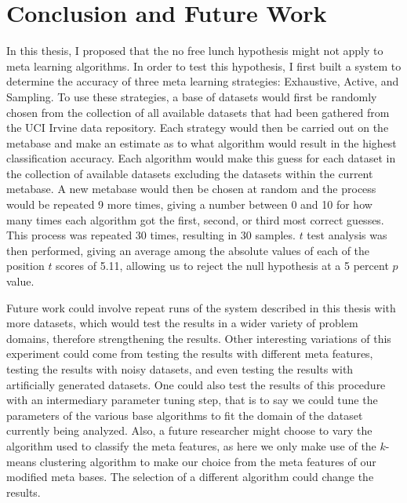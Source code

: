 \chapter{Conclusion and Future Work}
\label{Chapter5}
In this thesis, I proposed that the no free lunch hypothesis might not apply to
meta learning algorithms. In order to test this hypothesis, I first built a
system to determine the accuracy of three meta learning strategies:
Exhaustive, Active, and Sampling. To use these strategies, a base of
datasets would first be randomly chosen from the collection of all available
datasets that had been gathered from the UCI Irvine data repository.
Each strategy would then be carried out on the metabase and make an
estimate as to what algorithm would result in the highest classification
accuracy. Each algorithm would make this guess for each dataset in the
collection of available datasets excluding the datasets within the current
metabase. A new metabase would then be chosen at random and the process would be
repeated 9 more times, giving a number between 0 and 10 for how many times
each algorithm got the first, second, or third most correct guesses.
This process was repeated 30 times, resulting in 30 samples. $t$ test analysis
was then performed, giving an average among the absolute values of each of
the position $t$ scores of 5.11, allowing us to reject the null
hypothesis at a 5 percent $p$ value.

Future work could involve repeat runs of the system described in this thesis
with more datasets, which would test the results in a wider variety of problem
domains, therefore strengthening the results. Other interesting variations of
this experiment could come from testing the results with different meta features,
testing the results with noisy datasets, and even testing the results with
artificially generated datasets. One could also test the results of this
procedure with an intermediary parameter tuning step, that is to say
we could tune the parameters of the various base algorithms to fit the domain
of the dataset currently being analyzed. Also, a future researcher might
choose to vary the algorithm used to classify the meta features, as here we
only make use of the $k$-means clustering algorithm to make our choice from the meta
features of our modified meta bases. The selection of a different algorithm
could change the results.
